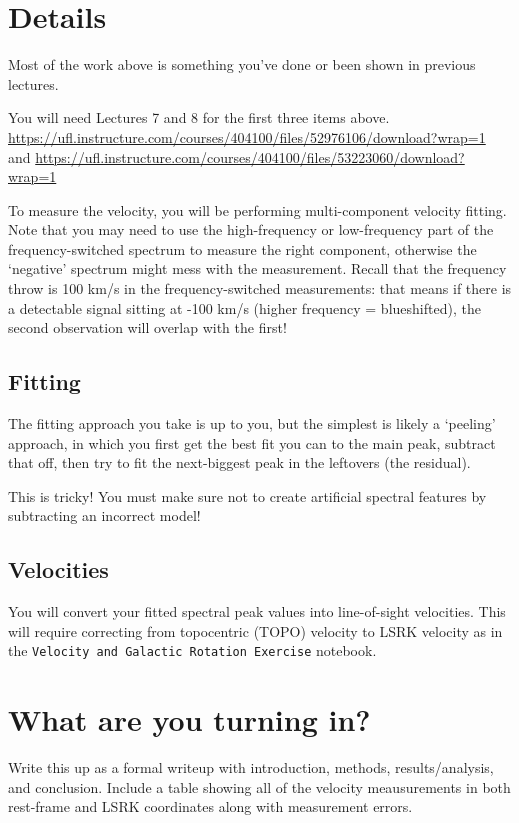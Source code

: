\documentclass[11pt]{article}
\begin{document}
\section{Details}
Most of the work above is something you've done or been shown in previous lectures.

You will need Lectures 7 and 8 for the first three items above.
\url{https://ufl.instructure.com/courses/404100/files/52976106/download?wrap=1} and \url{https://ufl.instructure.com/courses/404100/files/53223060/download?wrap=1}

To measure the velocity, you will be performing multi-component velocity
fitting.  Note that you may need to use the high-frequency or low-frequency
part of the frequency-switched spectrum to measure the right component,
otherwise the `negative' spectrum might mess with the measurement.  Recall that
the frequency throw is 100 km/s in the frequency-switched measurements: that
means if there is a detectable signal sitting at -100 km/s (higher frequency =
blueshifted), the second observation will overlap with the first!

\subsection{Fitting}
The fitting approach you take is up to you, but the simplest is likely a
`peeling' approach, in which you first get the best fit you can to the main
peak, subtract that off, then try to fit the next-biggest peak in the leftovers
(the residual).

This is tricky!  You must make sure not to create artificial spectral features
by subtracting an incorrect model!

\subsection{Velocities}
You will convert your fitted spectral peak values into line-of-sight
velocities.  This will require correcting from topocentric (TOPO) velocity
to LSRK velocity as in the \texttt{Velocity and Galactic Rotation Exercise} notebook.


\section{What are you turning in?}

Write this up as a formal writeup with introduction, methods, results/analysis, and conclusion.
Include a table showing all of the velocity meausurements in both rest-frame and LSRK coordinates
along with measurement errors.
\end{document}
